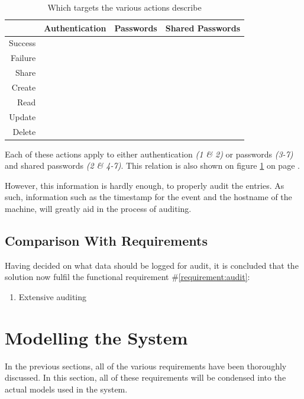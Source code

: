 		\begin{table}
			\begin{tabular}{r | c | c | c }
							& \textbf{Authentication} 		& \textbf{Passwords} 		& \textbf{Shared Passwords} 	\\
				\hline
				Success 	& \cmark 						& \xmark 					& \xmark 						\\
				Failure 	& \cmark 						& \xmark 					& \xmark 						\\
				Share 		& \xmark 						& \xmark 					& \cmark 						\\
				Create 		& \xmark 						& \cmark 					& \xmark 						\\
				Read 		& \xmark 						& \cmark 					& \cmark 						\\
				Update 		& \xmark 						& \cmark 					& \cmark 						\\
				Delete 		& \xmark 						& \cmark 					& \cmark 						\\
			\end{tabular}
			\caption{Which targets the various actions describe}
			\label{table:actions}
		\end{table}

		Each of these actions apply to either authentication \emph{(1 \& 2)} or passwords \emph{(3-7)} and shared passwords \emph{(2 \& 4-7)}. This relation is also shown on figure \ref{table:actions} on page \pageref{table:actions}.
		
		However, this information is hardly enough, to properly audit the entries. As such, information such as the timestamp for the event and the hostname of the machine, will greatly aid in the process of auditing. 

		\subsection{Comparison With Requirements}
			\label{requirement:fulfilled:audit}
			Having decided on what data should be logged for audit, it is concluded that the solution now fulfil the functional requirement \#\ref{requirement:audit}:
			\vspace{-3ex}\begin{enumerate}
				\setlength\itemsep{0.1em}
				\setcounter{enumi}{13-1}
				\item Extensive auditing
			\end{enumerate}

	\section{Modelling the System}
		\label{sec:modelling}
		In the previous sections, all of the various requirements have been thoroughly discussed. In this section, all of these requirements will be condensed into the actual models used in the system. 

